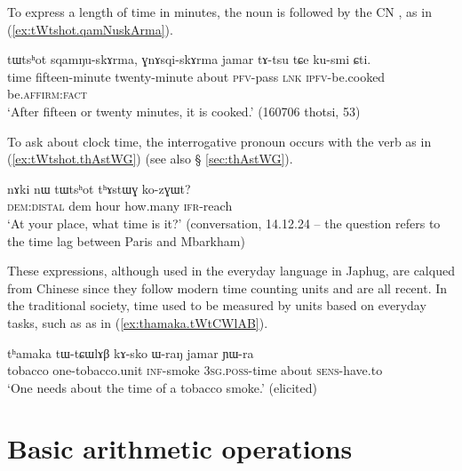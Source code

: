 To express a length of time in minutes, the noun    is followed by the CN , as in (\ref{ex:tWtshot.qamNuskArma}).
  
\begin{exe}
\ex \label{ex:tWtshot.qamNuskArma}
\gll  tɯtsʰot sqamŋu-skɤrma, ɣnɤsqi-skɤrma jamar tɤ-tsu tɕe ku-smi ɕti. \\
 time fifteen-minute twenty-minute about \textsc{pfv}-pass \textsc{lnk} \textsc{ipfv}-be.cooked be.\textsc{affirm}:\textsc{fact} \\
\glt `After fifteen or twenty minutes, it is cooked.' (160706 thotsi, 53)
\end{exe}

To ask about clock time, the interrogative pronoun  occurs with the verb  as in (\ref{ex:tWtshot.thAstWG}) (see also § \ref{sec:thAstWG}).

\begin{exe}
\ex \label{ex:tWtshot.thAstWG}
\gll     nɤki nɯ tɯtsʰot tʰɤstɯɣ ko-zɣɯt? \\
 \textsc{dem}:\textsc{distal} dem hour how.many \textsc{ifr}-reach \\
\glt  `At your place, what time is it?' (conversation, 14.12.24 -- the question refers to the time lag between Paris and Mbarkham)
\end{exe}
    
 These expressions, although used in the everyday language in Japhug, are calqued from Chinese since they follow modern time counting units and are all recent. In the traditional society, time used to be measured by units based on everyday tasks, such as  as in  (\ref{ex:thamaka.tWtCWlAB}).
 
\begin{exe}
\ex \label{ex:thamaka.tWtCWlAB}
\gll    tʰamaka tɯ-tɕɯlɤβ kɤ-sko ɯ-raŋ jamar ɲɯ-ra \\
tobacco  one-tobacco.unit \textsc{inf}-smoke \textsc{3sg}.\textsc{poss}-time about \textsc{sens}-have.to \\
\glt `One needs about the time of a tobacco smoke.' (elicited)
\end{exe}
    
\section{Basic arithmetic operations} \label{sec:arithmetic}


